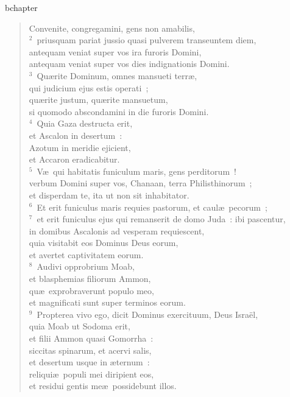 bchapter\begin{flushleft}\begin{verse}\vspace{-19pt}Convenite, congregamini, gens non amabilis,\\
${}^{2}$~priusquam pariat jussio quasi pulverem transeuntem diem,\\ antequam veniat super vos ira furoris Domini,\\ antequam veniat super vos dies indignationis Domini.\\
${}^{3}$~Qu\ae rite Dominum, omnes mansueti terr\ae ,\\ qui judicium ejus estis operati~;\\ qu\ae rite justum, qu\ae rite mansuetum,\\ si quomodo abscondamini in die furoris Domini.\\
${}^{4}$~Quia Gaza destructa erit,\\ et Ascalon in desertum~:\\ Azotum in meridie ejicient,\\ et Accaron eradicabitur.\\
${}^{5}$~V\ae\ qui habitatis funiculum maris, gens perditorum~!\\ verbum Domini super vos, Chanaan, terra Philisthinorum~;\\ et disperdam te, ita ut non sit inhabitator.\\
${}^{6}$~Et erit funiculus maris requies pastorum, et caul\ae\ pecorum~;\\
${}^{7}$~et erit funiculus ejus qui remanserit de domo Juda~: ibi pascentur,\\ in domibus Ascalonis ad vesperam requiescent,\\ quia visitabit eos Dominus Deus eorum,\\ et avertet captivitatem eorum.\\
${}^{8}$~Audivi opprobrium Moab,\\ et blasphemias filiorum Ammon,\\ qu\ae\ exprobraverunt populo meo,\\ et magnificati sunt super terminos eorum.\\
${}^{9}$~Propterea vivo ego, dicit Dominus exercituum, Deus Isra\"el,\\ quia Moab ut Sodoma erit,\\ et filii Ammon quasi Gomorrha~:\\ siccitas spinarum, et acervi salis,\\ et desertum usque in \ae ternum~:\\ reliqui\ae\ populi mei diripient eos,\\ et residui gentis me\ae\ possidebunt illos.\\

\end{verse}
\end{flushleft}
